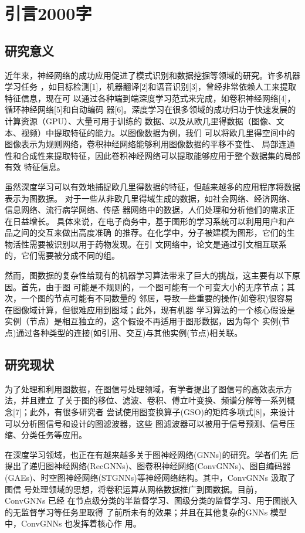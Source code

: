 \cleardoublepage

\section{引言2000字}

\subsection{研究意义}
近年来，神经网络的成功应用促进了模式识别和数据挖掘等领域的研究。许多机器学习任务
，如目标检测[1]，机器翻译[2]和语音识别[3]，曾经非常依赖人工来提取特征信息，现在可
以通过各种端到端深度学习范式来完成，如卷积神经网络[4]，循环神经网络[5]和自动编码
器[6]。深度学习在很多领域的成功归功于快速发展的计算资源（GPU）、大量可用于训练的
数据、以及从欧几里得数据（图像、文本、视频）中提取特征的能力。以图像数据为例，我们
可以将欧几里得空间中的图像表示为规则网络，卷积神经网络能够利用图像数据的平移不变性、
局部连通性和合成性来提取特征，因此卷积神经网络可以提取能够应用于整个数据集的局部有效
特征信息。

虽然深度学习可以有效地捕捉欧几里得数据的特征，但越来越多的应用程序将数据表示为图数据。
对于一些从非欧几里得域生成的数据，如社会网络、经济网络、信息网络、流行病学网络、传感
器网络中的数据，人们处理和分析他们的需求正在日益增长。
具体来说，在电子商务中，基于图形的学习系统可以利用用户和产品之间的交互来做出高度准确
的推荐。在化学中，分子被建模为图形，它们的生物活性需要被识别以用于药物发现。在引
文网络中，论文是通过引文相互联系的，它们需要被分成不同的组。

然而，图数据的复杂性给现有的机器学习算法带来了巨大的挑战，这主要有以下原因。首先，由于图
可能是不规则的，一个图可能有一个可变大小的无序节点；其次，一个图的节点可能有不同数量的
邻居，导致一些重要的操作(如卷积)很容易在图像域计算，但很难应用到图域；此外，现有机器
学习算法的一个核心假设是实例（节点）是相互独立的，这个假设不再适用于图形数据，因为每个
实例(节点)通过各种类型的连接(如引用、交互)与其他实例(节点)相关联。

\subsection{研究现状}
为了处理和利用图数据，在图信号处理领域，有学者提出了图信号的高效表示方法，并且建立
了关于图的移位、滤波、卷积、傅立叶变换、频谱分解等一系列概念[7]；此外，有很多研究者
尝试使用图变换算子(GSO)的矩阵多项式[8]，来设计可以分析图信号和设计的图滤波器，这些
图滤波器可以被用于信号预测、信号压缩、分类任务等应用。

在深度学习领域，也正在有越来越多关于图神经网络(GNNs)的研究。学者们先
后提出了递归图神经网络(RecGNNs)、图卷积神经网络(ConvGNNs)、图自编码器
(GAEs)、时空图神经网络(STGNNs)等神经网络结构。其中，ConvGNNs 汲取了图信
号处理领域的思想，将卷积运算从网格数据推广到图数据。目前，ConvGNNs 已经
在节点级分类的半监督学习、图级分类的监督学习、用于图嵌入的无监督学习等任务里取得
了前所未有的效果；并且在其他复杂的GNNs 模型中，ConvGNNs 也发挥着核心作
用。

